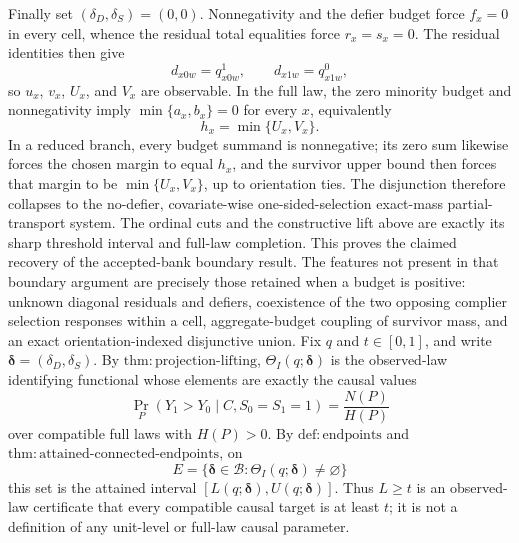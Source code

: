 Finally set \((\delta_D,\delta_S)=(0,0)\).  Nonnegativity and the defier budget force \(f_x=0\) in every cell, whence the residual total equalities force \(r_x=s_x=0\).  The residual identities then give
\[
 d_{x0w}=q^1_{x0w},
 \qquad
 d_{x1w}=q^0_{x1w},
\]
so \(u_x\), \(v_x\), \(U_x\), and \(V_x\) are observable.  In the full law, the zero minority budget and nonnegativity imply \(\min\{a_x,b_x\}=0\) for every \(x\), equivalently
\[
 h_x=\min\{U_x,V_x\}.
\]
In a reduced branch, every budget summand is nonnegative; its zero sum likewise forces the chosen margin to equal \(h_x\), and the survivor upper bound then forces that margin to be \(\min\{U_x,V_x\}\), up to orientation ties.  The disjunction therefore collapses to the no-defier, covariate-wise one-sided-selection exact-mass partial-transport system.  The ordinal cuts and the constructive lift above are exactly its sharp threshold interval and full-law completion.  This proves the claimed recovery of the accepted-bank boundary result.  The features not present in that boundary argument are precisely those retained when a budget is positive: unknown diagonal residuals and defiers, coexistence of the two opposing complier selection responses within a cell, aggregate-budget coupling of survivor mass, and an exact orientation-indexed disjunctive union.
Fix \(q\) and \(t\in[0,1]\), and write \(\boldsymbol\delta=(\delta_D,\delta_S)\).  By \(\mathrm{thm:projection\text{-}lifting}\), \(\Theta_I(q;\boldsymbol\delta)\) is the observed-law identifying functional whose elements are exactly the causal values
\[
 \Pr_P(Y_1>Y_0\mid C,S_0=S_1=1)=\frac{N(P)}{H(P)}
\]
over compatible full laws with \(H(P)>0\).  By \(\mathrm{def:endpoints}\) and \(\mathrm{thm:attained\text{-}connected\text{-}endpoints}\), on
\[
 E=\{\boldsymbol\delta\in\mathcal B:\Theta_I(q;\boldsymbol\delta)\neq\varnothing\}
\]
this set is the attained interval \([L(q;\boldsymbol\delta),U(q;\boldsymbol\delta)]\).  Thus \(L\geq t\) is an observed-law certificate that every compatible causal target is at least \(t\); it is not a definition of any unit-level or full-law causal parameter.

